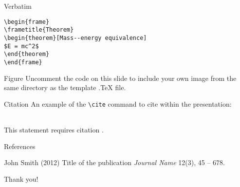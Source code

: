 \documentclass{beamer}
\begin{document}
\begin{frame}[fragile]{Verbatim}
\begin{example}
\begin{verbatim}
\begin{frame}
\frametitle{Theorem}
\begin{theorem}[Mass--energy equivalence]
$E = mc^2$
\end{theorem}
\end{frame}\end{verbatim}
\end{example}
\end{frame}


\begin{frame}{Figure}
Uncomment the code on this slide to include your own image from the same directory as the template .TeX file.
\end{frame}

\begin{frame}[fragile]{Citation}
An example of the \verb|\cite| command to cite within the presentation:\\~

This statement requires citation \cite{p1}.
\end{frame}


\begin{frame}{References}
\footnotesize{
\begin{thebibliography}{99} 
 John Smith (2012)
\newblock Title of the publication
\newblock \emph{Journal Name} 12(3), 45 -- 678.
\end{thebibliography}
}
\end{frame}


\begin{frame}
\Huge{\centerline{Thank you!}}
\end{frame}

\end{document}
